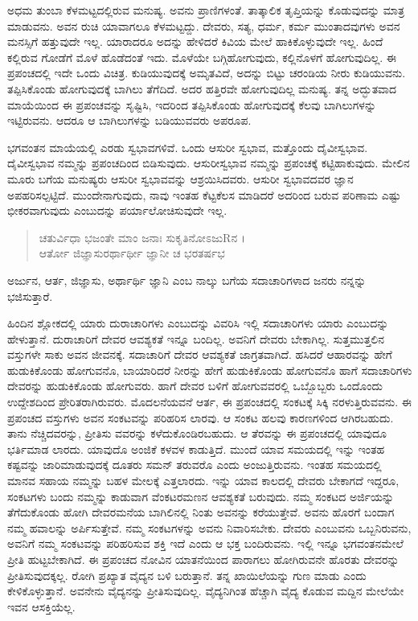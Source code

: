ಅಧಮ ತುಂಬಾ ಕೆಳಮಟ್ಟದಲ್ಲಿರುವ ಮನುಷ್ಯ. ಅವನು ಪ್ರಾಣಿಗಳಂತೆ. ತಾತ್ಕಾಲಿಕ ತೃಪ್ತಿಯನ್ನು ಕೊಡುವುದನ್ನು ಮಾತ್ರ ಮಾಡುವನು. ಅವನ ರುಚಿ ಯಾವಾಗಲೂ ಕೆಳಮಟ್ಟದ್ದು. ದೇವರು, ಸತ್ಯ, ಧರ್ಮ, ಕರ್ಮ ಮುಂತಾದವುಗಳು ಅವನ ಮನಸ್ಸಿಗೆ ಹತ್ತುವುದೇ ಇಲ್ಲ. ಯಾರಾದರೂ ಅದನ್ನು ಹೇಳಿದರೆ ಕಿವಿಯ ಮೇಲೆ ಹಾಕಿಕೊಳ್ಳುವುದೇ ಇಲ್ಲ. ಹಿಂದೆ ಕಲ್ಲಿರುವ ಗೋಡೆಗೆ ಮೊಳೆ ಹೊಡೆದಂತೆ ಇದು. ಮೊಳೆಯೇ ಬಗ್ಗಿಹೋಗುವುದು, ಕಲ್ಲಿನೊಳಗೆ ಹೋಗುವುದಿಲ್ಲ. ಈ ಪ್ರಪಂಚದಲ್ಲಿ ಇದೇ ಒಂದು ವಿಚಿತ್ರ. ಕುಡಿಯುವುದಕ್ಕೆ ಅಮೃತವಿದೆ, ಅದನ್ನು ಬಿಟ್ಟು ಚರಂಡಿಯ ನೀರು ಕುಡಿಯುವನು. ತಪ್ಪಿಸಿಕೊಂಡು ಹೋಗುವುದಕ್ಕೆ ಬಾಗಿಲು ತೆಗೆದಿದೆ. ಅದರ ಹತ್ತಿರವೇ ಹೋಗುವುದಿಲ್ಲ ಮನುಷ್ಯ. ತನ್ನ ಅದ್ಭುತವಾದ ಮಾಯೆಯಿಂದ ಈ ಪ್ರಪಂಚವನ್ನು ಸೃಷ್ಟಿಸಿ, ಇದರಿಂದ ತಪ್ಪಿಸಿಕೊಂಡು ಹೋಗುವುದಕ್ಕೆ ಕೆಲವು ಬಾಗಿಲುಗಳನ್ನು ಇಟ್ಟಿರುವನು. ಆದರೂ ಆ ಬಾಗಿಲುಗಳನ್ನು ಬಡಿಯುವವರು ಅಪರೂಪ. 

ಭಗವಂತನ ಮಾಯೆಯಲ್ಲಿ ಎರಡು ಸ್ವಭಾವಗಳಿವೆ. ಒಂದು ಆಸುರೀ ಸ್ವಭಾವ, ಮತ್ತೊಂದು ದೈವೀಸ್ವಭಾವ. ದೈವೀಸ್ವಭಾವ ನಮ್ಮನ್ನು ಪ್ರಪಂಚದಿಂದ ಬಿಡಿಸುವುದು. ಆಸುರೀಸ್ವಭಾವ ನಮ್ಮನ್ನು ಪ್ರಪಂಚಕ್ಕೆ ಕಟ್ಟಿಹಾಕುವುದು. ಮೇಲಿನ ಮೂರು ಬಗೆಯ ಮನುಷ್ಯರು ಆಸುರೀ ಸ್ವಭಾವವನ್ನು ಆಶ್ರಯಿಸಿದವರು. ಆಸುರೀ ಸ್ವಭಾವದವರ ಜ್ಞಾನ ಅಪಹರಿಸಲ್ಪಟ್ಟಿದೆ. ಮುಂದೇನಾಗುವುದು, ನಾವು ಇಂತಹ ಕೆಟ್ಟಕೆಲಸ ಮಾಡಿದರೆ ಅದರಿಂದ ಬರುವ ಪರಿಣಾಮ ಎಷ್ಟು ಭೀಕರವಾಗುವುದು ಎಂಬುದನ್ನು ಪರ್ಯಾಲೋಚಿಸುವುದೇ ಇಲ್ಲ.

\begin{verse}
ಚತುರ್ವಿಧಾ ಭಜಂತೇ ಮಾಂ ಜನಾಃ ಸುಕೃತಿನೋಽಜುRನ ।\\ಆರ್ತೋ ಜಿಜ್ಞಾಸುರರ್ಥಾರ್ಥೀ ಜ್ಞಾನೀ ಚ ಭರತರ್ಷಭ 
\end{verse}

{\small ಅರ್ಜುನ, ಆರ್ತ, ಜಿಜ್ಞಾಸು, ಅರ್ಥಾರ್ಥಿ ಜ್ಞಾನಿ ಎಂಬ ನಾಲ್ಕು ಬಗೆಯ ಸದಾಚಾರಿಗಳಾದ ಜನರು ನನ್ನನ್ನು ಭಜಿಸುತ್ತಾರೆ.}

ಹಿಂದಿನ ಶ್ಲೋಕದಲ್ಲಿ ಯಾರು ದುರಾಚಾರಿಗಳು ಎಂಬುದನ್ನು ವಿವರಿಸಿ ಇಲ್ಲಿ ಸದಾಚಾರಿಗಳು ಯಾರು ಎಂಬುದನ್ನು ಹೇಳುತ್ತಾನೆ. ದುರಾಚಾರಿಗೆ ದೇವರ ಆವಶ್ಯಕತೆ ಇನ್ನೂ ಬಂದಿಲ್ಲ. ಅವನಿಗೆ ದೇವರು ಬೇಕಾಗಿಲ್ಲ. ಸುತ್ತಮುತ್ತಲಿನ ವಸ್ತುಗಳೇ ಸಾಕು ಅವನ ಜೀವನಕ್ಕೆ. ಸದಾಚಾರಿಗೆ ದೇವರ ಆವಶ್ಯಕತೆ ಜಾಗ್ರತವಾಗಿದೆ. ಹಸಿದರೆ ಆಹಾರವನ್ನು ಹೇಗೆ ಹುಡುಕಿಕೊಂಡು ಹೋಗುವನೊ, ಬಾಯಾರಿದರೆ ನೀರನ್ನು ಹೇಗೆ ಹುಡುಕಿಕೊಂಡು ಹೋಗುವನೊ ಹಾಗೆ ಸದಾಚಾರಿಗಳು ದೇವರನ್ನು ಹುಡುಕಿಕೊಂಡು ಹೋಗುವರು. ಹಾಗೆ ದೇವರ ಬಳಿಗೆ ಹೋಗುವವರಲ್ಲಿ ಒಬ್ಬೊಬ್ಬರು ಒಂದೊಂದು ಉದ್ದೇಶದಿಂದ ಪ್ರೇರಿತರಾಗಿರುವರು. ಮೊದಲನೆಯವನೆ ಆರ್ತ, ಈ ಪ್ರಪಂಚದಲ್ಲಿ ಸಂಕಟಕ್ಕೆ ಸಿಕ್ಕಿ ನರಳುತ್ತಿರುವವನು. ಈ ಪ್ರಪಂಚದ ವಸ್ತುಗಳು ಅವನ ಸಂಕಟವನ್ನು ಪರಿಹರಿಸ ಲಾರವು. ಆ ಸಂಕಟ ಹಲವು ಕಾರಣಗಳಿಂದ ಆಗಿರಬಹುದು. ತಾನು ನೆಚ್ಚಿದವರನ್ನು, ಪ್ರೀತಿಸು ವವರನ್ನು ಕಳೆದುಕೊಂಡಿರಬಹುದು. ಆ ತೆರವನ್ನು ಈ ಪ್ರಪಂಚದಲ್ಲಿ ಯಾವುದೂ ಭರ್ತಿಮಾಡ ಲಾರದು. ಯಾವುದೊ ಅಂಜಿಕೆ ಕಳವಳ ಕಾಡುತ್ತಿದೆ. ಮುಂದೆ ಯಾವ ಸಮಯದಲ್ಲಿ ಇನ್ನು ಇಂತಹ ಕಷ್ಟವನ್ನು ಜಾರಿಮಾಡುವುದಕ್ಕೆ ದೂತರು ಸಮನ್ ತರುವರೊ ಎಂದು ಅಂಜುತ್ತಿರುವನು. ಇಂತಹ ಸಮಯದಲ್ಲಿ ಮಾನವ ಸಹಾಯ ನಮ್ಮನ್ನು ಬಹಳ ಮೇಲಕ್ಕೆ ಎತ್ತಲಾರದು. ಇನ್ನು ಯಾವ ಕಾಲದಲ್ಲಿ ದೇವರು ಬೇಕಾಗದೆ ಇದ್ದರೂ, ಸಂಕಟಗಳು ಬಂದು ನಮ್ಮನ್ನು ಕಾಡುವಾಗ ವೆಂಕಟರಮಣನ ಆವಶ್ಯಕತೆ ಬರುವುದು. ನಮ್ಮ ಸಂಕಟದ ಅರ್ಜಿಯನ್ನು ತೆಗೆದುಕೊಂಡು ಹೋಗಿ ದೇವರಮನೆಯ ಬಾಗಿಲಿನಲ್ಲಿ ನಿಂತು ಅವನನ್ನು ಕರೆಯುತ್ತೇವೆ. ಅವನು ಹೊರಗೆ ಬಂದಾಗ ನಮ್ಮ ಹವಾಲನ್ನು ಅರ್ಪಿಸುತ್ತೇವೆ. ನಮ್ಮ ಸಂಕಟಗಳನ್ನು ಅವನು ನಿವಾರಿಸಬೇಕು. ದೇವರು ಎಂಬುವನು ಒಬ್ಬನಿರುವನು, ಅವನಿಗೆ ನಮ್ಮ ಸಂಕಟವನ್ನು ಪರಿಹರಿಸುವ ಶಕ್ತಿ ಇದೆ ಎಂದು ಆ ಭಕ್ತ ಬಂದಿರುವನು. ಇಲ್ಲಿ ಇನ್ನೂ ಭಗವಂತನಮೇಲೆ ಪ್ರೀತಿ ಹುಟ್ಟಬೇಕಾಗಿದೆ. ಈ ಪ್ರಪಂಚದ ನೋವಿನ ಯಾತನೆಯಿಂದ ಪಾರಾಗಲು ಹೋಗಿರುವನೇ ಹೊರತು ದೇವರನ್ನು ಪ್ರೀತಿಸುವುದಕ್ಕಲ್ಲ. ರೋಗಿ ಪ್ರಖ್ಯಾತ ವೈದ್ಯನ ಬಳಿ ಬರುತ್ತಾನೆ. ತನ್ನ ಖಾಯಿಲೆಯನ್ನು ಗುಣ ಮಾಡು ಎಂದು ಕೇಳಿಕೊಳ್ಳುತ್ತಾನೆ. ಅವನೇನು ವೈದ್ಯನನ್ನು ಪ್ರೀತಿಸುವುದಿಲ್ಲ. ವೈದ್ಯನಿಗಿಂತ ಹೆಚ್ಚಾಗಿ ವೈದ್ಯ ಕೊಡುವ ಮದ್ದಿನ ಮೇಲೆಯೇ ಇವನ ಆಸಕ್ತಿಯೆಲ್ಲ.

